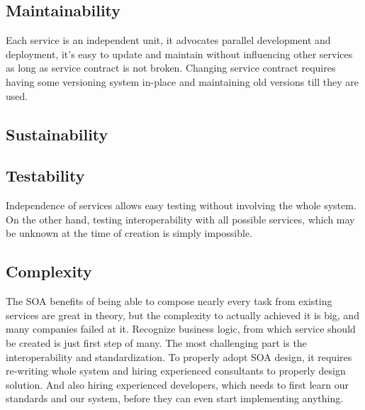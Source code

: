 \subsection{Maintainability}
Each service is an independent unit, it advocates parallel development and deployment, it's easy to update and maintain without influencing other services as long as service contract is not broken. Changing service contract requires having some versioning system in-place and maintaining old versions till they are used.

\subsection{Sustainability}

\subsection{Testability}
Independence of services allows easy testing without involving the whole system. On the other hand, testing interoperability with all possible services, which may be unknown at the time of creation is simply impossible.


\subsection{Complexity}
The SOA benefits of being able to compose nearly every task from existing services are great in theory, but the complexity to actually achieved it is big, and many companies failed at it. Recognize business logic, from which service should be created is just first step of many. The most challenging part is the interoperability and standardization. To properly adopt SOA design, it requires re-writing whole system and hiring experienced consultants to properly design solution. And also hiring experienced developers, which needs to first learn our standards and our system, before they can even start implementing anything.